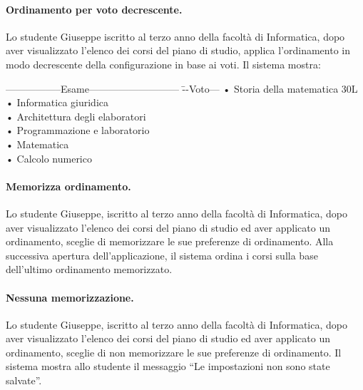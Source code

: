 \paragraph{Ordinamento per voto decrescente.}
Lo studente Giuseppe iscritto al terzo anno della facoltà di Informatica, dopo aver visualizzato l'elenco dei corsi del piano di studio, applica l'ordinamento in modo decrescente della configurazione in base ai voti. Il sistema mostra:

 \begin{tabbing}
	\hspace{1cm}-----------------Esame--------------------------- \= --Voto--- \kill
	\hspace{1cm} • Storia della matematica \> 30L \\
	\hspace{1cm} • Informatica giuridica   \\
	\hspace{1cm} • Architettura degli elaboratori   \\
	\hspace{1cm} • Programmazione e laboratorio  \\
	\hspace{1cm} • Matematica   \\
	\hspace{1cm} • Calcolo numerico   \\
\end{tabbing}

\paragraph{Memorizza ordinamento.}
Lo studente Giuseppe, iscritto al terzo anno della facoltà di Informatica, dopo aver visualizzato l’elenco dei corsi del piano di studio ed aver applicato un ordinamento, sceglie di memorizzare le sue preferenze di ordinamento. Alla successiva apertura dell’applicazione, il sistema ordina i corsi sulla base dell'ultimo ordinamento memorizzato.

\paragraph{Nessuna memorizzazione.}
Lo studente Giuseppe, iscritto al terzo anno della facoltà di Informatica, dopo aver visualizzato l’elenco dei corsi del piano di studio ed aver applicato un ordinamento, sceglie di non memorizzare le sue preferenze di ordinamento. Il sistema mostra allo studente il messaggio “Le impostazioni non sono state salvate”. 





